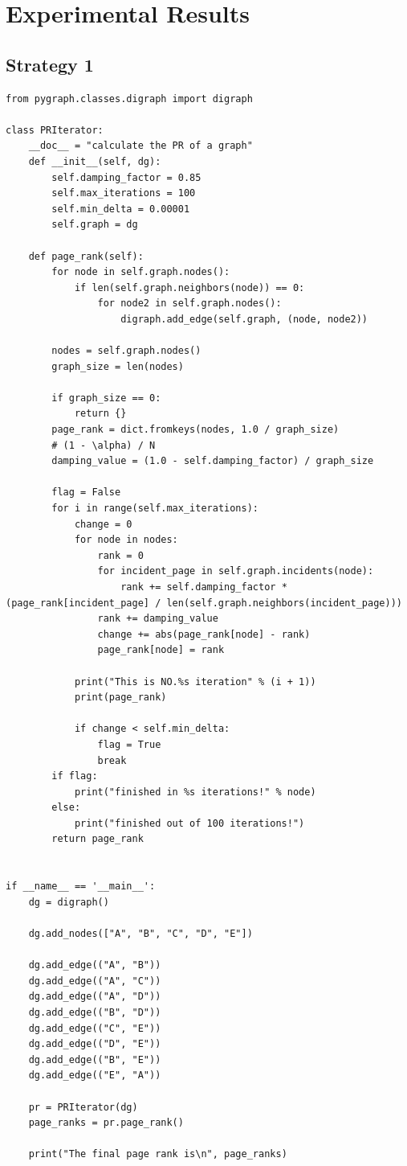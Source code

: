 \documentclass{article}
\begin{document}
\section{Experimental Results}
\subsection{Strategy 1}
\begin{lstlisting}
from pygraph.classes.digraph import digraph

class PRIterator:
    __doc__ = "calculate the PR of a graph"
    def __init__(self, dg):
        self.damping_factor = 0.85 
        self.max_iterations = 100  
        self.min_delta = 0.00001
        self.graph = dg

    def page_rank(self):
        for node in self.graph.nodes():
            if len(self.graph.neighbors(node)) == 0:
                for node2 in self.graph.nodes():
                    digraph.add_edge(self.graph, (node, node2))

        nodes = self.graph.nodes()
        graph_size = len(nodes)

        if graph_size == 0:
            return {}
        page_rank = dict.fromkeys(nodes, 1.0 / graph_size)  
        # (1 - \alpha) / N
        damping_value = (1.0 - self.damping_factor) / graph_size  

        flag = False
        for i in range(self.max_iterations):
            change = 0
            for node in nodes:
                rank = 0
                for incident_page in self.graph.incidents(node): 
                    rank += self.damping_factor * (page_rank[incident_page] / len(self.graph.neighbors(incident_page)))
                rank += damping_value
                change += abs(page_rank[node] - rank) 
                page_rank[node] = rank

            print("This is NO.%s iteration" % (i + 1))
            print(page_rank)

            if change < self.min_delta:
                flag = True
                break
        if flag:
            print("finished in %s iterations!" % node)
        else:
            print("finished out of 100 iterations!")
        return page_rank


if __name__ == '__main__':
    dg = digraph()

    dg.add_nodes(["A", "B", "C", "D", "E"])

    dg.add_edge(("A", "B"))
    dg.add_edge(("A", "C"))
    dg.add_edge(("A", "D"))
    dg.add_edge(("B", "D"))
    dg.add_edge(("C", "E"))
    dg.add_edge(("D", "E"))
    dg.add_edge(("B", "E"))
    dg.add_edge(("E", "A"))

    pr = PRIterator(dg)
    page_ranks = pr.page_rank()

    print("The final page rank is\n", page_ranks)

\end{lstlisting}
\end{document}
